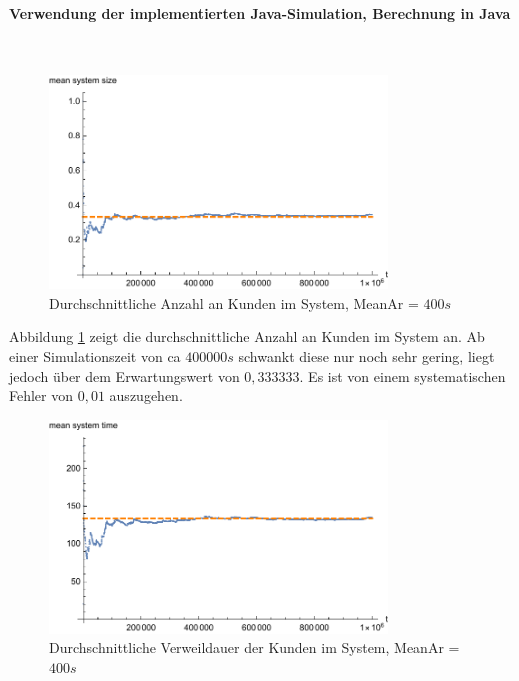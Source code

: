 \paragraph{Verwendung der implementierten Java-Simulation, Berechnung in Java}
\\
\begin{figure}[htpb]
	\centering
	\includegraphics[width=0.8\textwidth]{abbildungen/1_Phone/Arrival_400_Serve_100_dur_1000000_Skip_0/MeanSystemSize.pdf}
	\caption{Durchschnittliche Anzahl an Kunden im System, MeanAr = $400s$}
	\label{fig:meanSystemSize400}
\end{figure}

Abbildung \ref{fig:meanSystemSize400} zeigt die durchschnittliche Anzahl an Kunden im System an. Ab einer Simulationszeit von ca $400000s$ schwankt diese nur noch sehr gering, liegt jedoch über dem Erwartungswert von $0,333333$. Es ist von einem systematischen Fehler von $0,01$ auszugehen.

\begin{figure}[htpb]
	\centering
	\includegraphics[width=0.8\textwidth]{abbildungen/1_Phone/Arrival_400_Serve_100_dur_1000000_Skip_0/MeanSystemTime.pdf}
	\caption{Durchschnittliche Verweildauer der Kunden im System, MeanAr = $400s$}
	\label{fig:meanSystemTime400}
\end{figure}

